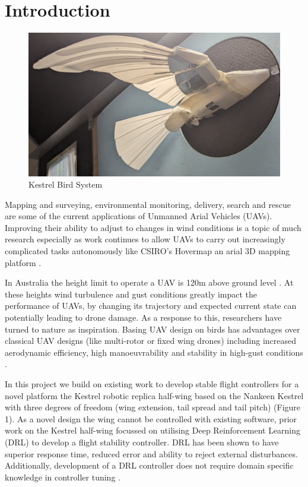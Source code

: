 \section{Introduction}

    \begin{figure}
        \includegraphics[width=\textwidth/2]{./Resources/Kestrel.jpg}
        \caption{\label{fig:figure 1} Kestrel Bird System}
    \end{figure}

    Mapping and surveying, environmental monitoring, delivery, search and
    rescue are some of the current applications of Unmanned Arial Vehicles
    (UAVs). Improving their ability to adjust to changes in wind conditions
    is a topic of much research \cite{1} especially as work continues to
    allow UAVs to carry out increasingly complicated tasks autonomously
    like CSIRO’s Hovermap an arial 3D mapping platform \cite{2}.

    In Australia the height limit to operate a UAV is 120m above ground
    level \cite{3}. At these heights wind turbulence and gust conditions greatly
    impact the performance of UAVs, by changing its trajectory and expected
    current state can potentially leading to drone damage. As a response to
    this, researchers have turned to nature as inspiration. Basing UAV
    design on birds has advantages over classical UAV designs (like
    multi-rotor or fixed wing drones) including increased aerodynamic
    efficiency, high manoeuvrability and stability in high-gust conditions \cite{4}.

    In this project we build on existing work to develop stable flight
    controllers for a novel platform the Kestrel robotic replica half-wing
    based on the Nankeen Kestrel with three degrees of freedom (wing
    extension, tail spread and tail pitch) \cite{5}
    (Figure 1).
    As a novel design
    the wing cannot be controlled with existing software, prior work on the
    Kestrel half-wing focussed on utilising Deep Reinforcement Learning
    (DRL) to develop a flight stability controller. DRL has been shown
    to have superior response time, reduced error and ability to reject
    external disturbances. Additionally, development of a DRL controller
    does not require domain specific knowledge in controller tuning \cite{6}.

